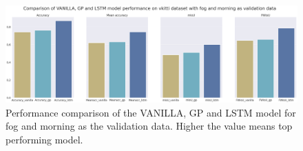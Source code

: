 %		

	\begin{figure}
		\centering
		
		\includegraphics[width=13cm]{images/vkitti_performance_metric_fog_morning.png}
		\caption{Performance comparison of the VANILLA, GP and LSTM model for fog and morning as the validation data. Higher the value means top performing model.}
		\label{fig:performance_metric_vkitti_two_class_box_plot}
	\end{figure}

%		
%
%	
%	
%		
%
%	

